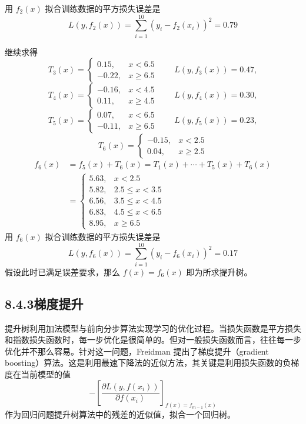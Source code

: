 \documentclass[UTF8, 12pt, fontset=fandol, oneside]{ctexart}
\begin{document}
用 $f_2(x)$ 拟合训练数据的平方损失误差是
\[
L(y,f_2(x))=\sum_{i=1}^{10}(y_i-f_2(x_i))^2=0.79
\]

继续求得
\[
T_3(x)=
\begin{cases}
0.15, & x<6.5\\
-0.22, & x\geq 6.5
\end{cases}
\qquad
L(y,f_3(x))=0.47,
\]
\[
T_4(x)=
\begin{cases}
-0.16, & x<4.5\\
0.11, & x\geq 4.5
\end{cases}
\qquad
L(y,f_4(x))=0.30,
\]
\[
T_5(x)=
\begin{cases}
0.07, & x<6.5\\
-0.11, & x\geq 6.5
\end{cases}
\qquad
L(y,f_5(x))=0.23,
\]
\[
T_6(x)=
\begin{cases}
-0.15, & x<2.5\\
0.04, & x\geq 2.5
\end{cases}
\]
\[
\begin{aligned}
f_6(x)&=f_5(x)+T_6(x)=T_1(x)+\cdots+T_5(x)+T_6(x)\\
&=
\begin{cases}
5.63, & x<2.5\\
5.82, & 2.5\leq x<3.5\\
6.56, & 3.5\leq x<4.5\\
6.83, & 4.5\leq x<6.5\\
8.95, & x\geq 6.5
\end{cases}
\end{aligned}
\]
用 $f_6(x)$ 拟合训练数据的平方损失误差是
\[
L(y,f_6(x))=\sum_{i=1}^{10}(y_i-f_6(x_i))^2=0.17
\]
假设此时已满足误差要求，那么 $f(x)=f_6(x)$ 即为所求提升树。

\subsection*{8.4.3\quad 梯度提升}

提升树利用加法模型与前向分步算法实现学习的优化过程。当损失函数是平方损失和指数损失函数时，每一步优化是很简单的。但对一般损失函数而言，往往每一步优化并不那么容易。针对这一问题，Freidman 提出了梯度提升（gradient boosting）算法。这是利用最速下降法的近似方法，其关键是利用损失函数的负梯度在当前模型的值
\[
-\left[\frac{\partial L(y,f(x_i))}{\partial f(x_i)}\right]_{f(x)=f_{m-1}(x)}
\]
作为回归问题提升树算法中的残差的近似值，拟合一个回归树。
\end{document}
